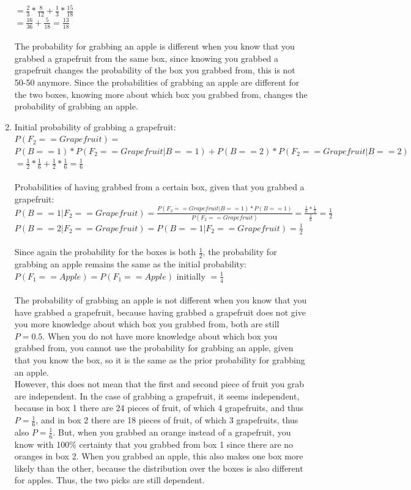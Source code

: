 \documentclass[a4paper,11pt]{article}
\theoremstyle{mytheor}
\begin{document}
\begin{enumerate}
$= \frac{2}{3} * \frac{8}{12} + \frac{1}{3} * \frac{15}{18}$ \\
$= \frac{16}{36} + \frac{5}{18} = \frac{13}{18}$\\
\\
The probability for grabbing an apple is different when you know that you grabbed a grapefruit from the same box, since knowing you grabbed a grapefruit changes the probability of the box you grabbed from, this is not 50-50 anymore. Since the probabilities of grabbing an apple are different for the two boxes, knowing more about which box you grabbed from, changes the probability of grabbing an apple.

\item Initial probability of grabbing a grapefruit:\\
$P(F_2 == Grapefruit) = $\\
$P(B == 1) * P(F_2 == Grapefruit | B == 1) + P(B == 2) * P(F_2 == Grapefruit | B == 2)$ \\
$= \frac{1}{2} * \frac{1}{6} + \frac{1}{2} * \frac{1}{6} = \frac{1}{6}$\\
\\
Probabilities of having grabbed from a certain box, given that you grabbed a grapefruit:\\
$P(B == 1 | F_2 == Grapefruit) = \frac{P(F_2 == Grapefruit | B == 1) * P(B == 1)}{P(F_2 == Grapefruit)} = \frac{\frac{1}{6} * \frac{1}{2}}{\frac{1}{6}} = \frac{1}{2}$\\
$P(B == 2 | F_2 == Grapefruit) = P(B == 1 | F_2 == Grapefruit) = \frac{1}{2}$\\
\\
Since again the probability for the boxes is both $\frac{1}{2}$, the probability for grabbing an apple remains the same as the initial probability:\\
$P(F_1 == Apple) = P(F_1 == Apple)$ initially $= \frac{1}{4}$\\
\\
The probability of grabbing an apple is not different when you know that you have grabbed a grapefruit, because having grabbed a grapefruit does not give you more knowledge about which box you grabbed from, both are still $P = 0.5$. When you do not have more knowledge about which box you grabbed from, you cannot use the probability for grabbing an apple, given that you know the box, so it is the same as the prior probability for grabbing an apple.\\

However, this does not mean that the first and second piece of fruit you grab are independent. In the case of grabbing a grapefruit, it seems independent, because in box 1 there are 24 pieces of fruit, of which 4 grapefruits, and thus $P = \frac{1}{6}$, and in box 2 there are 18 pieces of fruit, of which 3 grapefruits, thus also  $P = \frac{1}{6}$. But, when you grabbed an orange instead of a grapefruit, you know with 100\% certainty that you grabbed from box 1 since there are no oranges in box 2. When you grabbed an apple, this also makes one box more likely than the other, because the distribution over the boxes is also different for apples. Thus, the two picks are still dependent.
\end{enumerate}
\end{document}

